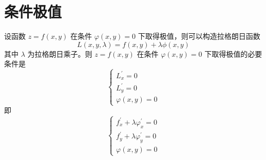 \section{条件极值}

\begin{theorem}[拉格朗日乘数法]
    设函数 $z=f(x,y)$ 在条件 $\varphi(x,y)=0$ 下取得极值，则可以构造拉格朗日函数
    \begin{equation}
        L(x,y,\lambda)=f(x,y)+\lambda\phi(x,y)
    \end{equation}
    其中 $\lambda$ 为拉格朗日乘子。则 $z=f(x,y)$ 在条件 $\varphi(x,y)=0$ 下取得极值的必要条件是
    \begin{equation}
        \begin{cases}
            L^{\prime}_x=0 \\
            L^{\prime}_y=0 \\
            \varphi(x,y)=0
        \end{cases}
    \end{equation}
    即
    \begin{equation}
        \begin{cases}
            f^{\prime}_x+\lambda\varphi^{\prime}_x=0 \\
            f^{\prime}_y+\lambda\varphi^{\prime}_y=0 \\
            \varphi(x,y)=0
        \end{cases}
    \end{equation}
\end{theorem}
